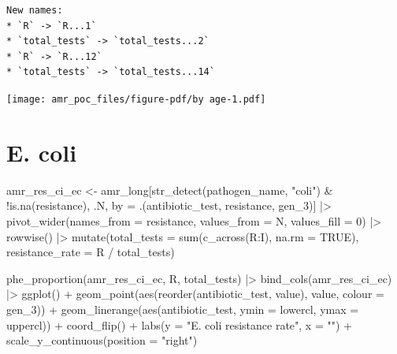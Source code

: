 \documentclass[
  letterpaper,
  DIV=11,
  numbers=noendperiod]{scrreprt}
\newenvironment{Shaded}{\begin{snugshade}}{\end{snugshade}}
\newcommand{\AttributeTok}[1]{\textcolor[rgb]{0.40,0.45,0.13}{#1}}
\newcommand{\ConstantTok}[1]{\textcolor[rgb]{0.56,0.35,0.01}{#1}}
\newcommand{\DecValTok}[1]{\textcolor[rgb]{0.68,0.00,0.00}{#1}}
\newcommand{\FunctionTok}[1]{\textcolor[rgb]{0.28,0.35,0.67}{#1}}
\newcommand{\NormalTok}[1]{\textcolor[rgb]{0.00,0.23,0.31}{#1}}
\newcommand{\OtherTok}[1]{\textcolor[rgb]{0.00,0.23,0.31}{#1}}
\newcommand{\SpecialCharTok}[1]{\textcolor[rgb]{0.37,0.37,0.37}{#1}}
\newcommand{\StringTok}[1]{\textcolor[rgb]{0.13,0.47,0.30}{#1}}
\begin{document}
\begin{verbatim}
New names:
* `R` -> `R...1`
* `total_tests` -> `total_tests...2`
* `R` -> `R...12`
* `total_tests` -> `total_tests...14`
\end{verbatim}

\texttt{[image: amr\_poc\_files/figure-pdf/by age-1.pdf]}

\section{E. coli}\label{e.-coli-1}

\begin{Shaded}
\begin{Highlighting}[]
\NormalTok{amr\_res\_ci\_ec }\OtherTok{\textless{}{-}}\NormalTok{ amr\_long[}\FunctionTok{str\_detect}\NormalTok{(pathogen\_name, }\StringTok{"coli"}\NormalTok{) }\SpecialCharTok{\&} \SpecialCharTok{!}\FunctionTok{is.na}\NormalTok{(resistance), .N, by }\OtherTok{=}\NormalTok{ .(antibiotic\_test, resistance, gen\_3)] }\SpecialCharTok{|\textgreater{}}
    \FunctionTok{pivot\_wider}\NormalTok{(}\AttributeTok{names\_from =}\NormalTok{ resistance, }\AttributeTok{values\_from =}\NormalTok{ N, }\AttributeTok{values\_fill =} \DecValTok{0}\NormalTok{) }\SpecialCharTok{|\textgreater{}}
    \FunctionTok{rowwise}\NormalTok{() }\SpecialCharTok{|\textgreater{}}
    \FunctionTok{mutate}\NormalTok{(}\AttributeTok{total\_tests =} \FunctionTok{sum}\NormalTok{(}\FunctionTok{c\_across}\NormalTok{(R}\SpecialCharTok{:}\NormalTok{I), }\AttributeTok{na.rm =} \ConstantTok{TRUE}\NormalTok{), }
           \AttributeTok{resistance\_rate =}\NormalTok{ R }\SpecialCharTok{/}\NormalTok{ total\_tests)}

\FunctionTok{phe\_proportion}\NormalTok{(amr\_res\_ci\_ec, R, total\_tests) }\SpecialCharTok{|\textgreater{}}
    \FunctionTok{bind\_cols}\NormalTok{(amr\_res\_ci\_ec) }\SpecialCharTok{|\textgreater{}}
    \FunctionTok{ggplot}\NormalTok{() }\SpecialCharTok{+}
    \FunctionTok{geom\_point}\NormalTok{(}\FunctionTok{aes}\NormalTok{(}\FunctionTok{reorder}\NormalTok{(antibiotic\_test, value), value, }\AttributeTok{colour =}\NormalTok{ gen\_3)) }\SpecialCharTok{+}
    \FunctionTok{geom\_linerange}\NormalTok{(}\FunctionTok{aes}\NormalTok{(antibiotic\_test, }\AttributeTok{ymin =}\NormalTok{ lowercl, }\AttributeTok{ymax =}\NormalTok{ uppercl)) }\SpecialCharTok{+}
    \FunctionTok{coord\_flip}\NormalTok{() }\SpecialCharTok{+}
    \FunctionTok{labs}\NormalTok{(}\AttributeTok{y =} \StringTok{"E. coli resistance rate"}\NormalTok{, }\AttributeTok{x =} \StringTok{""}\NormalTok{) }\SpecialCharTok{+} \FunctionTok{scale\_y\_continuous}\NormalTok{(}\AttributeTok{position =} \StringTok{"right"}\NormalTok{)}
\end{Highlighting}
\end{Shaded}
\end{document}
